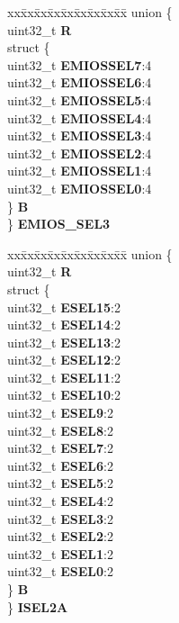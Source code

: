 \begin{DoxyCompactItemize}
\begin{tabbing}
\end{tabbing}\item 
\mbox{\label{structSIU__tag_aa67d10fed396aebee5f5b99b71dc557e}} 
\begin{tabbing}
xx\=xx\=xx\=xx\=xx\=xx\=xx\=xx\=xx\=\kill
union \{\\
\>uint32\_t {\bfseries R}\\
\>struct \{\\
\>\>uint32\_t {\bfseries EMIOSSEL7}:4\\
\>\>uint32\_t {\bfseries EMIOSSEL6}:4\\
\>\>uint32\_t {\bfseries EMIOSSEL5}:4\\
\>\>uint32\_t {\bfseries EMIOSSEL4}:4\\
\>\>uint32\_t {\bfseries EMIOSSEL3}:4\\
\>\>uint32\_t {\bfseries EMIOSSEL2}:4\\
\>\>uint32\_t {\bfseries EMIOSSEL1}:4\\
\>\>uint32\_t {\bfseries EMIOSSEL0}:4\\
\>\} {\bfseries B}\\
\} {\bfseries EMIOS\_SEL3}\\

\end{tabbing}\item 
\mbox{\label{structSIU__tag_ae92661a7c06b7db272cfcff81d49ee46}} 
\begin{tabbing}
xx\=xx\=xx\=xx\=xx\=xx\=xx\=xx\=xx\=\kill
union \{\\
\>uint32\_t {\bfseries R}\\
\>struct \{\\
\>\>uint32\_t {\bfseries ESEL15}:2\\
\>\>uint32\_t {\bfseries ESEL14}:2\\
\>\>uint32\_t {\bfseries ESEL13}:2\\
\>\>uint32\_t {\bfseries ESEL12}:2\\
\>\>uint32\_t {\bfseries ESEL11}:2\\
\>\>uint32\_t {\bfseries ESEL10}:2\\
\>\>uint32\_t {\bfseries ESEL9}:2\\
\>\>uint32\_t {\bfseries ESEL8}:2\\
\>\>uint32\_t {\bfseries ESEL7}:2\\
\>\>uint32\_t {\bfseries ESEL6}:2\\
\>\>uint32\_t {\bfseries ESEL5}:2\\
\>\>uint32\_t {\bfseries ESEL4}:2\\
\>\>uint32\_t {\bfseries ESEL3}:2\\
\>\>uint32\_t {\bfseries ESEL2}:2\\
\>\>uint32\_t {\bfseries ESEL1}:2\\
\>\>uint32\_t {\bfseries ESEL0}:2\\
\>\} {\bfseries B}\\
\} {\bfseries ISEL2A}\\


\end{tabbing}
\end{DoxyCompactItemize}
